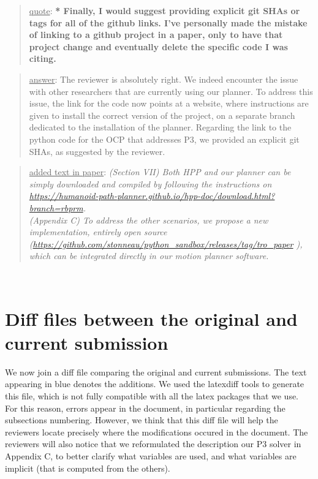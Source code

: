 \documentclass[a4paper]{article}
\newcommand{\done}[0]{}
\newcommand\quot[1]{\begin{quote} \underline{quote}: \textbf{#1}\end{quote}}
\newcommand\as[1]{\begin{quote} \underline{answer}: {#1}\end{quote} }
\newcommand\qt[1]{\begin{quote} \underline{added text in paper}: \textit{#1}\end{quote} \leavevmode \\ }
\begin{document}
\quot{* Finally, I would suggest providing explicit git SHAs or tags for all
of the github links. I've personally made the mistake of linking to a
github project in a paper, only to have that project change and
eventually delete the specific code I was citing. }
\as{The reviewer is absolutely right. We indeed encounter the issue with other researchers that are currently using our planner. 
To address this issue, the link for the code now points at a website, where instructions are given to install the correct version of the project, on a separate branch
dedicated to the installation of the planner.
Regarding the link to the python code for the OCP that addresses P3, we provided an explicit git SHAs, as suggested by the reviewer.}
\qt{(Section VII) Both HPP and our planner can be simply downloaded and compiled by following the instructions on
\url{https://humanoid-path-planner.github.io/hpp-doc/download.html?branch=rbprm}. \\
(Appendix C) To address the other scenarios, we propose a new implementation, entirely open source (\url{https://github.com/stonneau/python_sandbox/releases/tag/tro_paper} ), which can be integrated directly in our motion planner software. }
\done

\section{Diff files between the original and current submission}
We now join a diff file comparing the original and current submissions.
The text appearing in blue denotes the additions. We used the latexdiff tools to generate this file, which is not fully compatible with all the latex packages that we use.
For this reason, errors appear in the document, in particular regarding the subsections numbering. However, we think that this diff file will help the reviewers locate precisely
where the modifications occured in the document. The reviewers will also notice that we reformulated the description our P3 solver in Appendix C, to better clarify what variables
are used, and what variables are implicit (that is computed from the others).


\end{document}
